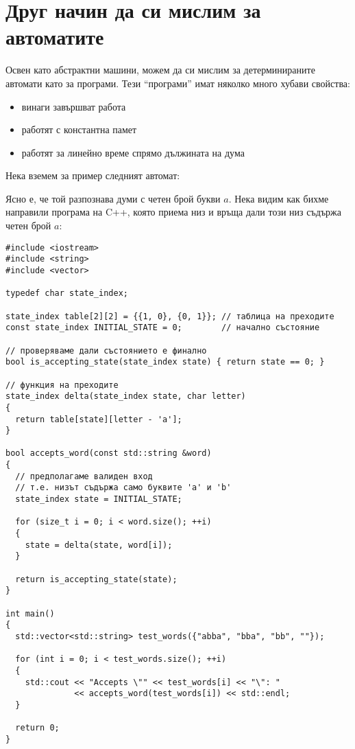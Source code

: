 \section{Друг начин да си мислим за автоматите}

Освен като абстрактни машини, можем да си мислим за детерминираните автомати като за програми.
Тези ``програми'' имат няколко много хубави свойства:
\begin{itemize}
    \item винаги завършват работа
    \item работят с константна памет
    \item работят за линейно време спрямо дължината на дума
\end{itemize}

Нека вземем за пример следният автомат:

\begin{center}
\end{center}

Ясно е, че той разпознава думи с четен брой букви $a$.
Нека видим как бихме направили програма на C++, която приема низ и връща дали този низ съдържа четен брой $a$:

\begin{verbatim}
#include <iostream>
#include <string>
#include <vector>

typedef char state_index;

state_index table[2][2] = {{1, 0}, {0, 1}}; // таблица на преходите
const state_index INITIAL_STATE = 0;        // начално състояние

// проверяваме дали състоянието е финално
bool is_accepting_state(state_index state) { return state == 0; }

// функция на преходите
state_index delta(state_index state, char letter)
{
  return table[state][letter - 'a'];
}

bool accepts_word(const std::string &word)
{
  // предполагаме валиден вход
  // т.е. низът съдържа само буквите 'a' и 'b'
  state_index state = INITIAL_STATE;

  for (size_t i = 0; i < word.size(); ++i)
  {
    state = delta(state, word[i]);
  }

  return is_accepting_state(state);
}

int main()
{
  std::vector<std::string> test_words({"abba", "bba", "bb", ""});

  for (int i = 0; i < test_words.size(); ++i)
  {
    std::cout << "Accepts \"" << test_words[i] << "\": "
              << accepts_word(test_words[i]) << std::endl;
  }

  return 0;
}
\end{verbatim}

